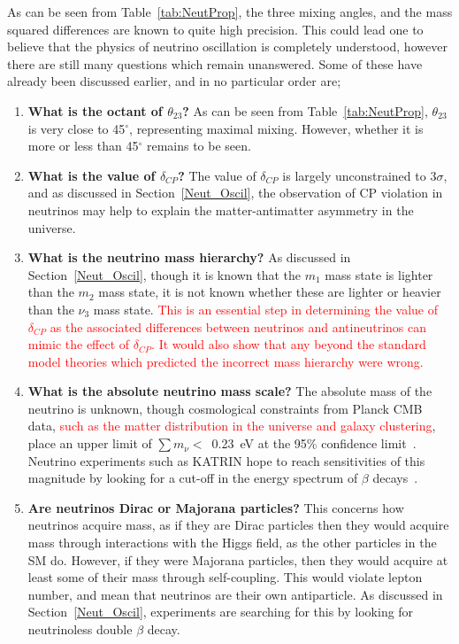 As can be seen from Table~\ref{tab:NeutProp}, the three mixing angles, and the mass squared differences are known to quite high precision. This could lead one to believe that the physics of neutrino oscillation is completely understood, however there are still many questions which remain unanswered. Some of these have already been discussed earlier, and in no particular order are;
\begin{enumerate}
\item \textbf{What is the octant of $\theta_{23}$?} As can be seen from Table~\ref{tab:NeutProp}, $\theta_{23}$ is very close to 45$^{\circ}$, representing maximal mixing. However, whether it is more or less than 45$^{\circ}$ remains to be seen.
\item \textbf{What is the value of $\delta_{CP}$?} The value of $\delta_{CP}$ is largely unconstrained to 3$\sigma$, and as discussed in Section~\ref{Neut_Oscil}, the observation of CP violation in neutrinos may help to explain the matter-antimatter asymmetry in the universe.  
\item \textbf{What is the neutrino mass hierarchy?} As discussed in Section~\ref{Neut_Oscil}, though it is known that the $m_{1}$ mass state is lighter than the $m_{2}$ mass state, it is not known whether these are lighter or heavier than the $\nu_{3}$ mass state. \textcolor{red}{This is an essential step in determining the value of $\delta_{CP}$ as the associated differences between neutrinos and antineutrinos can mimic the effect of $\delta_{CP}$. It would also show that any beyond the standard model theories which predicted the incorrect mass hierarchy were wrong.} 
\item \textbf{What is the absolute neutrino mass scale?} The absolute mass of the neutrino is unknown, though cosmological constraints from Planck CMB data, \textcolor{red}{such as the matter distribution in the universe and galaxy clustering}, place an upper limit of $\sum m_{\nu} <$~0.23~eV at the 95\% confidence limit~\citep{Planck}. Neutrino experiments such as KATRIN hope to reach sensitivities of this magnitude by looking for a cut-off in the energy spectrum of $\beta$ decays~\citep{KATRIN}.
\item \textbf{Are neutrinos Dirac or Majorana particles?} This concerns how neutrinos acquire mass, as if they are Dirac particles then they would acquire mass through interactions with the Higgs field, as the other particles in the SM do. However, if they were Majorana particles, then they would acquire at least some of their mass through self-coupling. This would violate lepton number, and mean that neutrinos are their own antiparticle. As discussed in Section~\ref{Neut_Oscil}, experiments are searching for this by looking for neutrinoless double $\beta$ decay.

\end{enumerate}
